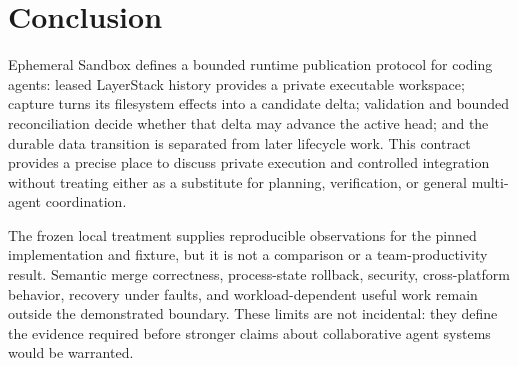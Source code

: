 \section{Conclusion}
\label{sec:conclusion}

Ephemeral Sandbox defines a bounded runtime publication protocol for coding
agents: leased LayerStack history provides a private executable workspace;
capture turns its filesystem effects into a candidate delta; validation and
bounded reconciliation decide whether that delta may advance the active head;
and the durable data transition is separated from later lifecycle work. This
contract provides a precise place to discuss private execution and controlled
integration without treating either as a substitute for planning, verification,
or general multi-agent coordination.

The frozen local treatment supplies reproducible observations for the pinned
implementation and fixture, but it is not a comparison or a team-productivity
result. Semantic merge correctness, process-state rollback, security,
cross-platform behavior, recovery under faults, and workload-dependent useful
work remain outside the demonstrated boundary. These limits are not incidental:
they define the evidence required before stronger claims about collaborative
agent systems would be warranted.
